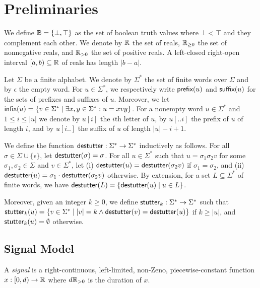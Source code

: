 \section{Preliminaries}

We define $\mathbb{B} = \{ \bot, \top \}$ as the set of boolean truth values where $\bot < \top$ and they complement each other.
We denote by $\mathbb{R}$ the set of reals, $\mathbb{R}_{\geq 0}$ the set of nonnegative reals, and $\mathbb{R}_{> 0}$ the set of positive reals.
A left-closed right-open interval $[a,b) \subseteq \mathbb{R}$ of reals has length $|b-a|$.

Let $\Sigma$ be a finite alphabet.
We denote by $\Sigma^*$ the set of finite words over $\Sigma$ and by $\epsilon$ the empty word.
For $u \in \Sigma^*$, we respectively write $\textsf{prefix}(u)$ and $\textsf{suffix}(u)$ for the sets of prefixes and suffixes of $u$.
Moreover, we let $\infx(u) = \{v \in \Sigma^* \st \exists x,y \in \Sigma^* : u = xvy\}$.
For a nonempty word $u \in \Sigma^*$ and $1 \leq i \leq |u|$ we denote by $u[i]$ the $i$th letter of $u$, by $u[..i]$ the prefix of $u$ of length $i$, and by $u[i..]$ the suffix of $u$ of length $|u| - i + 1$. 

We define the function $\mathsf{destutter} : \Sigma^* \to \Sigma^*$ inductively as follows.
For all $\sigma \in \Sigma \cup \{\epsilon\}$, let $\mathsf{destutter}(\sigma) = \sigma$.
For all $u \in \Sigma^*$ such that $u = \sigma_1 \sigma_2 v$ for some $\sigma_1,\sigma_2 \in \Sigma$ and $v \in \Sigma^*$, let (i) $\mathsf{destutter}(u) = \mathsf{destutter}(\sigma_2 v)$ if $\sigma_1 = \sigma_2$, and (ii) $\mathsf{destutter}(u) = \sigma_1 \cdot \mathsf{destutter}(\sigma_2 v)$ otherwise.
By extension, for a set $L \subseteq \Sigma^*$ of finite words, we have $\destutter(L) = \{\destutter(u) \st u \in L\}$.

Moreover, given an integer $k \geq 0$, we define $\mathsf{stutter}_k : \Sigma^* \to \Sigma^*$ such that $\stutter_k(u) = \{v \in \Sigma^* \st |v| = k \land \destutter(v) = \destutter(u)\}$ if $k \geq |u|$, and $\mathsf{stutter}_k(u) = \emptyset$ otherwise.

\subsection{Signal Model}

\begin{definition}
	A \emph{signal} is a right-continuous, left-limited, non-Zeno, piecewise-constant function $x : [0,d) \to \mathbb{R}$ where $d \mathbb{R}_{> 0}$ is the duration of $x$.
\end{definition}


